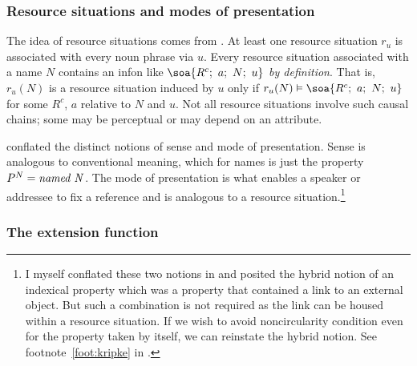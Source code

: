 

\subsubsection{Resource situations and modes of presentation}

The idea of resource situations comes from \citet{bp:sa}. At least one resource situation $r_u$ is associated with every noun phrase via $u$. Every resource situation associated with a name $N$ contains an infon like $\soa{R^c;\ a;\ N;\ u}$ \emph{by definition}. That is, $r_u(N)$ is a resource situation induced by $u$ only if $r_u(N) \vDash \soa{R^c;\ a;\ N;\ u}$ for some $R^c$, $a$ relative to $N$ and $u$. Not all resource situations involve such causal chains; some may be perceptual or may depend on an attribute.



\citet{frege:sr} conflated the distinct notions of sense and mode of presentation. Sense is analogous to conventional meaning, which for names is just the property $P^N = \hbox{\emph{named N}}$. The mode of presentation is what enables a speaker or addressee to fix a reference and is analogous to a resource situation.\footnote{I myself conflated these two notions in \citet[291]{parikh:le} and posited the hybrid notion of an indexical property which was a property that contained a link to an external object. But such a combination is not required as the link can be housed within a resource situation. If we wish to avoid  noncircularity condition even for the property taken by itself, we can reinstate the hybrid notion. See footnote~\ref{foot:kripke} in .}

\subsubsection{The extension function}


